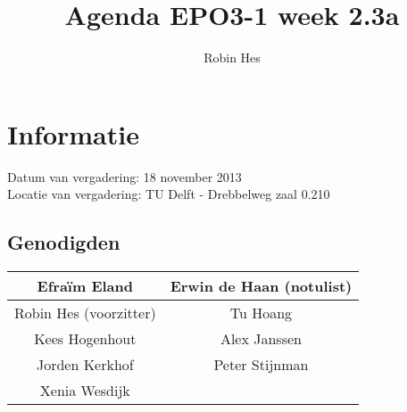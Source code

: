 \documentclass{article}
\begin{document}
\title{Agenda EPO3-1 week 2.3a}%
\author{Robin Hes}%
\maketitle

\section*{Informatie}
Datum van vergadering: 18 november 2013\\ %
Locatie van vergadering: TU Delft - Drebbelweg zaal 0.210 %
\subsection*{Genodigden}
\begin{center}
\begin{tabular}{|c |c |}
	\hline
	Efraïm Eland & Erwin de Haan (notulist)\\
	\hline
	Robin Hes (voorzitter) & Tu Hoang \\
	\hline
	Kees Hogenhout & Alex Janssen \\
	\hline
	Jorden Kerkhof & Peter Stijnman \\
	\hline
	Xenia Wesdijk & \\
	\hline
\end{tabular}
\end{center}
\end{document}
